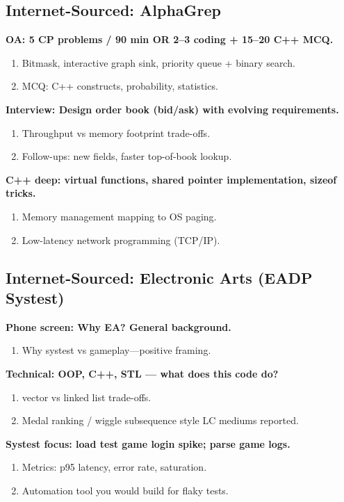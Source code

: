 \documentclass[9pt,a4paper]{article}
\begin{document}
\subsection{Internet-Sourced: AlphaGrep}
\textbf{OA: 5 CP problems / 90 min OR 2--3 coding + 15--20 C++ MCQ.}
\begin{enumerate}[label=\textit{Probe \arabic*:}]
  \item Bitmask, interactive graph sink, priority queue + binary search.
  \item MCQ: C++ constructs, probability, statistics.
\end{enumerate}
\vspace{2mm}
\textbf{Interview: Design order book (bid/ask) with evolving requirements.}
\begin{enumerate}[label=\textit{Probe \arabic*:}]
  \item Throughput vs memory footprint trade-offs.
  \item Follow-ups: new fields, faster top-of-book lookup.
\end{enumerate}
\vspace{2mm}
\textbf{C++ deep: virtual functions, shared pointer implementation, sizeof tricks.}
\begin{enumerate}[label=\textit{Probe \arabic*:}]
  \item Memory management mapping to OS paging.
  \item Low-latency network programming (TCP/IP).
\end{enumerate}
\vspace{2mm}
\subsection{Internet-Sourced: Electronic Arts (EADP Systest)}
\textbf{Phone screen: Why EA? General background.}
\begin{enumerate}[label=\textit{Probe \arabic*:}]
  \item Why systest vs gameplay---positive framing.
\end{enumerate}
\vspace{2mm}
\textbf{Technical: OOP, C++, STL --- what does this code do?}
\begin{enumerate}[label=\textit{Probe \arabic*:}]
  \item vector vs linked list trade-offs.
  \item Medal ranking / wiggle subsequence style LC mediums reported.
\end{enumerate}
\vspace{2mm}
\textbf{Systest focus: load test game login spike; parse game logs.}
\begin{enumerate}[label=\textit{Probe \arabic*:}]
  \item Metrics: p95 latency, error rate, saturation.
  \item Automation tool you would build for flaky tests.
\end{enumerate}
\vspace{2mm}
\end{document}
